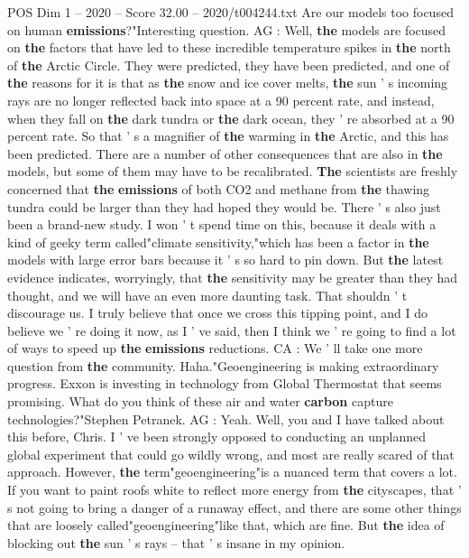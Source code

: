 \begin{textsample}{POS Dim 1 – 2020 – Score 32.00 – 2020/t004244.txt}
Are our models too focused on human \textbf{emissions}?"Interesting question.
AG : Well, \textbf{the} models are focused on \textbf{the} factors that have led to these incredible temperature spikes in \textbf{the} north of \textbf{the} Arctic Circle.
They were predicted, they have been predicted, and one of \textbf{the} reasons for it is that as \textbf{the} snow and ice cover melts, \textbf{the} sun ' s incoming rays are no longer reflected back into space at a 90 percent rate, and instead, when they fall on \textbf{the} dark tundra or \textbf{the} dark ocean, they ' re absorbed at a 90 percent rate.
So that ' s a magnifier of \textbf{the} warming in \textbf{the} Arctic, and this has been predicted.
There are a number of other consequences that are also in \textbf{the} models, but some of them may have to be recalibrated. \textbf{The} scientists are freshly concerned that \textbf{the} \textbf{emissions} of both CO2 and methane from \textbf{the} thawing tundra could be larger than they had hoped they would be.
There ' s also just been a brand-new study.
I won ' t spend time on this, because it deals with a kind of geeky term called"climate sensitivity,"which has been a factor in \textbf{the} models with large error bars because it ' s so hard to pin down.
But \textbf{the} latest evidence indicates, worryingly, that \textbf{the} sensitivity may be greater than they had thought, and we will have an even more daunting task.
That shouldn ' t discourage us.
I truly believe that once we cross this tipping point, and I do believe we ' re doing it now, as I ' ve said, then I think we ' re going to find a lot of ways to speed up \textbf{the} \textbf{emissions} reductions.
CA : We ' ll take one more question from \textbf{the} community.
Haha."Geoengineering is making extraordinary progress.
Exxon is investing in technology from Global Thermostat that seems promising.
What do you think of these air and water \textbf{carbon} capture technologies?"Stephen Petranek.
AG : Yeah.
Well, you and I have talked about this before, Chris.
I ' ve been strongly opposed to conducting an unplanned global experiment that could go wildly wrong, and most are really scared of that approach.
However, \textbf{the} term"geoengineering"is a nuanced term that covers a lot.
If you want to paint roofs white to reflect more energy from \textbf{the} cityscapes, that ' s not going to bring a danger of a runaway effect, and there are some other things that are loosely called"geoengineering"like that, which are fine.
But \textbf{the} idea of blocking out \textbf{the} sun ' s rays -- that ' s insane in my opinion.

\end{textsample}
